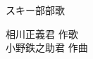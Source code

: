\documentclass[10pt,b5j]{tarticle} %
\begin{document}
\begin{minipage}[c]{0.7\hsize} %
    \begin{center}
        {\LARGE
            スキー部部歌 %
        }
        {\small 
        }
    \end{center}
\end{minipage}
\begin{minipage}[c]{0.3\hsize} %
    \begin{flushright} %
        相川正義君 作歌\\小野鉄之助君 作曲 %
    \end{flushright}
\end{minipage}
\end{document}
